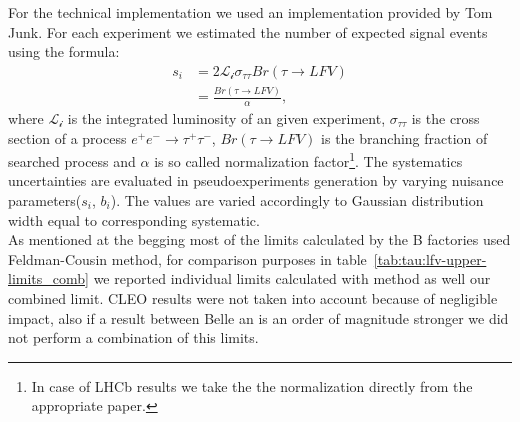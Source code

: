 For the technical implementation we used an implementation provided by Tom Junk\cite{tjunk}. For each experiment we estimated the number of expected signal events using the formula:
\begin{equation}
\begin{split}
s_i & =2\mathcal{L_i}\sigma_{\tau\tau}Br(\tau \rightarrow LFV) \\
& =\frac{Br(\tau \rightarrow LFV)}{\alpha},
\end{split}
\end{equation}
where $\mathcal{L_i}$ is the integrated luminosity of an given experiment, $\sigma_{\tau\tau}$ is the cross section of a process $e^+ e^- \rightarrow  \tau^+ \tau^-$, $Br(\tau \rightarrow LFV)$ is the branching fraction of searched process and $\alpha$ is so called normalization factor\footnote{In case of LHCb results we take the the normalization directly from the appropriate paper.}. The systematics uncertainties are evaluated in pseudoexperiments generation by varying nuisance parameters($s_i$, $b_i$). The values are varied accordingly to Gaussian distribution width equal to corresponding systematic.\\
As mentioned at the begging most of the limits calculated by the B factories used Feldman-Cousin method, for comparison purposes in table~\ref{tab:tau:lfv-upper-limits_comb} we reported individual limits calculated with \cls method as well our combined limit. CLEO results were not taken into account because of negligible impact, also if a result between Belle an \babar is an order of magnitude stronger we did not perform a combination of this limits.



